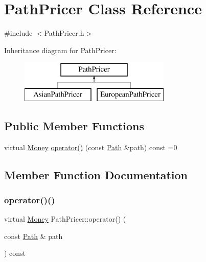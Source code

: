 \hypertarget{class_path_pricer}{}\section{Path\+Pricer Class Reference}
\label{class_path_pricer}


{\ttfamily \#include $<$Path\+Pricer.\+h$>$}

Inheritance diagram for Path\+Pricer\+:\begin{figure}[H]
\begin{center}
\leavevmode
\includegraphics[height=2.000000cm]{class_path_pricer}
\end{center}
\end{figure}
\subsection*{Public Member Functions}
\begin{DoxyCompactItemize}
\item 
virtual \hyperlink{_name_def_8h_a5a9d48c16a694e9a2d9f1eca730dc8c5}{Money} \hyperlink{class_path_pricer_a057bf6a83f0cc2be06154144192ed918}{operator()} (const \hyperlink{class_path}{Path} \&path) const =0
\end{DoxyCompactItemize}


\subsection{Member Function Documentation}
\hypertarget{class_path_pricer_a057bf6a83f0cc2be06154144192ed918}{}\label{class_path_pricer_a057bf6a83f0cc2be06154144192ed918} 
\subsubsection{\texorpdfstring{operator()()}{operator()()}}
{\footnotesize\ttfamily virtual \hyperlink{_name_def_8h_a5a9d48c16a694e9a2d9f1eca730dc8c5}{Money} Path\+Pricer\+::operator() (\begin{DoxyParamCaption}\item[{const \hyperlink{class_path}{Path} \&}]{path }\end{DoxyParamCaption}) const\hspace{0.3cm}{\ttfamily [pure virtual]}}



